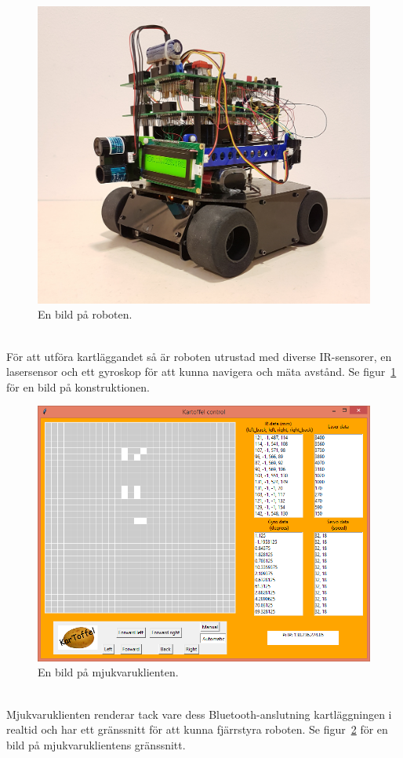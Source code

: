 \documentclass{article}
\begin{document}
\begin{figure}[H]
\centering
\includegraphics[scale=0.1]{robot_irl}
\caption{En bild på roboten.}
\label{fig:robot_bild}
\end{figure}
\ \\
För att utföra kartläggandet så är roboten utrustad med diverse IR-sensorer, en lasersensor och ett gyroskop för att kunna navigera och mäta avstånd. Se figur~\ref{fig:robot_bild} för en bild på konstruktionen.

\begin{figure}[H]
\centering
\includegraphics[scale=0.55]{client1}
\caption{En bild på mjukvaruklienten.}
\label{fig:klient_bild}
\end{figure}
\ \\
Mjukvaruklienten renderar tack vare dess Bluetooth-anslutning kartläggningen i realtid och har ett gränssnitt för att kunna fjärrstyra roboten. Se figur~\ref{fig:klient_bild} för en bild på mjukvaruklientens gränssnitt.
\end{document}
